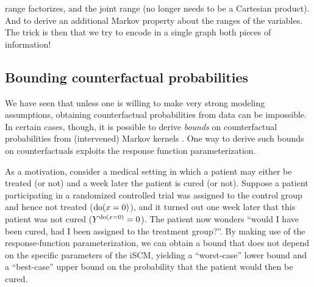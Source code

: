 {range factorizes, and the joint range (no longer needs to be a Cartesian product). And to derive an additional Markov property about the ranges of the variables. The trick is then that we try to encode in a single graph both pieces of information!}

\subsection{Bounding counterfactual probabilities}

We have seen that unless one is willing to make very strong modeling assumptions, obtaining counterfactual probabilities from data can be impossible.
In certain cases, though, it is possible to derive \emph{bounds} on counterfactual probabilities from (intervened) Markov kernels \cite{BalkePearl1994b}.
One way to derive such bounds on counterfactuals exploits the response function parameterization.

As a motivation, consider a medical setting in which a patient may either be treated (or not) and a week later the patient is cured (or not).
Suppose a patient participating in a randomized controlled trial was assigned to the control group and hence not treated ($\operatorname{do}(x=0)$), and it turned out one week later that this patient was not cured ($Y^{\operatorname{do}(x=0)}=0$).
The patient now wonders ``would I have been cured, had I been assigned to the treatment group?''.
By making use of the response-function parameterization, we can obtain a bound that does not depend on the specific parameters of the iSCM,
yielding a ``worst-case'' lower bound and a ``best-case'' upper bound on the probability that the patient would then be cured.


